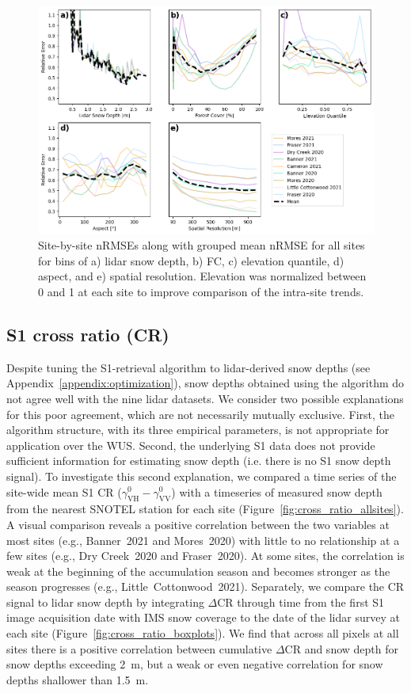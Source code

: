 \documentclass[journal abbreviation, manuscript]{copernicus}
\begin{document}
\begin{figure}[htbp]
    \centering
    \includegraphics[width=\textwidth]{figures/relative_error.png}
    \caption{Site-by-site nRMSEs along with grouped mean nRMSE for all sites for bins of a) lidar snow depth, b) FC, c) elevation quantile, d) aspect, and e) spatial resolution. Elevation was normalized between 0 and 1 at each site to improve comparison of the intra-site trends.}
    \label{fig:nrmse}
\end{figure}


\subsection{S1 cross ratio (CR)} \label{sec:results.cr}

Despite tuning the S1-retrieval algorithm to lidar-derived snow depths (see Appendix~\ref{appendix:optimization}), snow depths obtained using the algorithm do not agree well with the nine lidar datasets. We consider two possible explanations for this poor agreement, which are not necessarily mutually exclusive. First, the algorithm structure, with its three empirical parameters, is not appropriate for application over the WUS. Second, the underlying S1 data does not provide sufficient information for estimating snow depth (i.e. there is no S1 snow depth signal). To investigate this second explanation, we compared a time series of the site-wide mean S1 CR ($\gamma^0_{\mathrm{VH}} - \gamma^0_{\mathrm{VV}}$) with a timeseries of measured snow depth from the nearest SNOTEL station for each site (Figure~\ref{fig:cross_ratio_allsites}). A visual comparison reveals a positive correlation between the two variables at most sites (e.g., Banner~2021 and Mores~2020) with little to no relationship at a few sites (e.g., Dry Creek~2020 and Fraser~2020). At some sites, the correlation is weak at the beginning of the accumulation season and becomes stronger as the season progresses (e.g., Little~Cottonwood~2021). Separately, we compare the CR signal to lidar snow depth by integrating $\Delta$CR through time from the first S1 image acquisition date with IMS snow coverage to the date of the lidar survey at each site (Figure~\ref{fig:cross_ratio_boxplots}). We find that across all pixels at all sites there is a positive correlation between cumulative $\Delta$CR and snow depth for snow depths exceeding 2~m, but a weak or even negative correlation for snow depths shallower than 1.5~m. 
\end{document}

